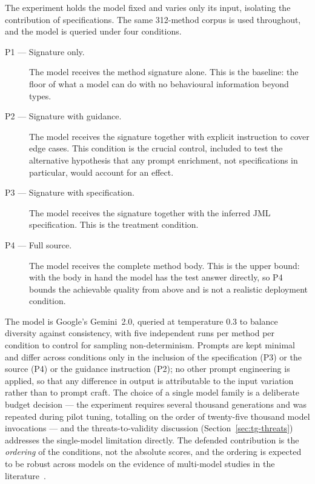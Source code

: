 The experiment holds the model fixed and varies only its input, isolating the
contribution of specifications. The same 312-method corpus is used throughout,
and the model is queried under four conditions.

\begin{description}
  \item[P1 --- Signature only.] The model receives the method signature alone.
        This is the baseline: the floor of what a model can do with no
        behavioural information beyond types.
  \item[P2 --- Signature with guidance.] The model receives the signature
        together with explicit instruction to cover edge cases. This condition
        is the crucial control, included to test the alternative hypothesis
        that any prompt enrichment, not specifications in particular, would
        account for an effect.
  \item[P3 --- Signature with specification.] The model receives the signature
        together with the inferred JML specification. This is the treatment
        condition.
  \item[P4 --- Full source.] The model receives the complete method body. This
        is the upper bound: with the body in hand the model has the test answer
        directly, so P4 bounds the achievable quality from above and is not a
        realistic deployment condition.
\end{description}

The model is Google's Gemini~2.0, queried at temperature 0.3 to balance
diversity against consistency, with five independent runs per method per
condition to control for sampling non-determinism. Prompts are kept minimal and
differ across conditions only in the inclusion of the specification (P3) or the
source (P4) or the guidance instruction (P2); no other prompt engineering is
applied, so that any difference in output is attributable to the input
variation rather than to prompt craft. The choice of a single model family is a
deliberate budget decision --- the experiment requires several thousand
generations and was repeated during pilot tuning, totalling on the order of
twenty-five thousand model invocations --- and the threats-to-validity
discussion (Section~\ref{sec:tg-threats}) addresses the single-model limitation
directly. The defended contribution is the \emph{ordering} of the conditions,
not the absolute scores, and the ordering is expected to be robust across
models on the evidence of multi-model studies in the
literature~\cite{schafer2023adaptive, yuan2024chattester, molinelli2025oracles}.

